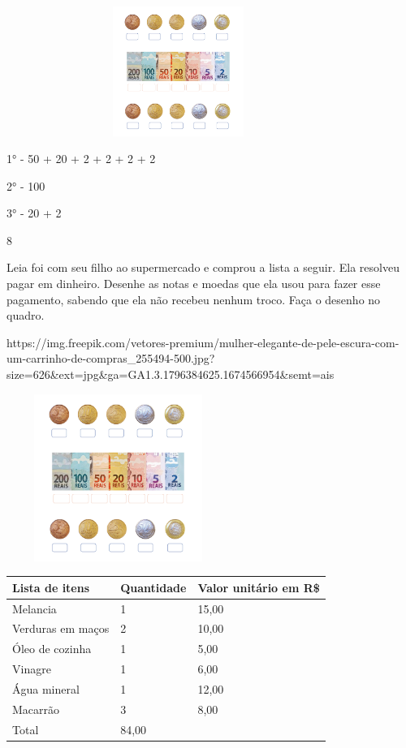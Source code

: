 {{{{{{{{{\includegraphics[width=4.40625in,height=1.66152in]{media/image72.png}

1° - 50 + 20 + 2 + 2 + 2 + 2

2° - 100

3° - 20 + 2


\num{8}

Leia foi com seu filho ao supermercado e comprou a lista a seguir. Ela
resolveu pagar em dinheiro. Desenhe as notas e moedas que ela usou para
fazer esse pagamento, sabendo que ela não recebeu nenhum troco. Faça o
desenho no quadro.

https://img.freepik.com/vetores-premium/mulher-elegante-de-pele-escura-com-um-carrinho-de-compras\_255494-500.jpg?size=626\&ext=jpg\&ga=GA1.3.1796384625.1674566954\&semt=ais

\includegraphics[width=2.86111in,height=2.14583in]{media/image74.png}

\begin{longtable}[]{@{}lll@{}}
\toprule
Lista de itens & Quantidade & Valor unitário em R\$\tabularnewline
\midrule
\endhead
Melancia & 1 & 15,00\tabularnewline
Verduras em maços & 2 & 10,00\tabularnewline
Óleo de cozinha & 1 & 5,00\tabularnewline
Vinagre & 1 & 6,00\tabularnewline
Água mineral & 1 & 12,00\tabularnewline
Macarrão & 3 & 8,00\tabularnewline
Total & 84,00\tabularnewline
\bottomrule
\end{longtable}

}}}}}}}}}
